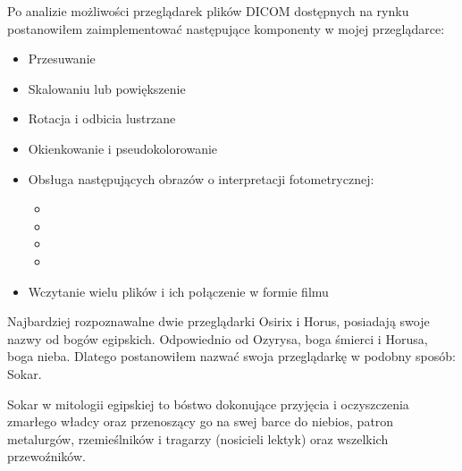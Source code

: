 
\par
Po analizie możliwości przeglądarek plików DICOM dostępnych na rynku postanowiłem zaimplementować następujące komponenty w mojej przeglądarce:
\begin{itemize}
      \item Przesuwanie 

      \item Skalowaniu lub powiększenie

      \item Rotacja i odbicia lustrzane

      \item Okienkowanie i pseudokolorowanie

      \item Obsługa następujących obrazów o interpretacji fotometrycznej:

            \begin{itemize}
                  \item {}
                  \item {}
                  \item {}
                  \item {}
            \end{itemize}

      \item Wczytanie wielu plików i ich połączenie w formie filmu
\end{itemize}

\par
Najbardziej rozpoznawalne dwie przeglądarki Osirix i Horus, posiadają swoje nazwy od bogów egipskich.
Odpowiednio od Ozyrysa, boga śmierci i Horusa, boga nieba.
Dlatego postanowiłem nazwać swoja przeglądarkę w podobny sposób: Sokar.
\par
Sokar w mitologii egipskiej to bóstwo dokonujące przyjęcia i oczyszczenia zmarłego władcy oraz przenoszący go na swej barce do niebios, patron metalurgów, rzemieślników i tragarzy (nosicieli lektyk) oraz wszelkich przewoźników.
